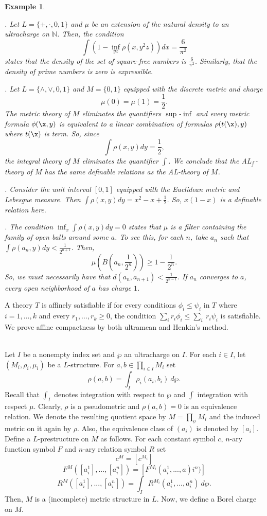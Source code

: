 \documentclass[12pt]{article}
\newtheorem{example}[theorem]{Example}
\def\Nn{\mathbb N}
\begin{document}
\begin{example}
\em{. Let $L=\{+,\cdot,0,1\}$ and $\mu$ be an extension of the natural density to an ultracharge on $\Nn$.
Then, the condition $$\int(1-\inf_{yz}\rho(x,y^2z))dx=\frac{6}{\pi^2}$$
states that the density of the set of square-free numbers is $\frac{6}{\pi^2}$.
Similarly, that the density of prime numbers is zero is expressible.

. Let $L=\{\wedge,\vee,0,1\}$ and $M=\{0,1\}$ equipped with the discrete metric and charge
$$\mu(0)=\mu(1)=\frac{1}{2}.$$
The metric theory of $M$ eliminates the quantifiers $\sup$-$\inf$ and every metric formula $\phi(\x,y)$
is equivalent to a linear combination of formulas $\rho(t(\x),y)$ where $t(\x)$ is term.
So, since $$\int\rho(x,y)dy=\frac{1}{2},$$ the integral theory of $M$ eliminates the quantifier $\int$.
We conclude that the AL$_{\int}$-theory of $M$ has the same definable relations as the AL-theory of $M$.
\bigskip

. Consider the unit interval $[0,1]$ equipped with the Euclidean metric and Lebesgue
measure. Then $\int \rho(x,y)dy=x^2-x+\frac{1}{2}$. So, $x(1-x)$ is a definable relation here.
\bigskip

. The condition $\inf_x\int\rho(x,y)dy=0$ states that $\mu$ is a filter containing
the family of open balls around some $a$.
To see this, for each $n$, take $a_n$ such that $\int\rho(a_n,y)dy<\frac{1}{2^{n+1}}$. Then,
$$\mu(B(a_n,\frac{1}{2^n}))\geqslant1-\frac{1}{2^n}.$$
So, we must necessarily have that $d(a_n,a_{n+1})<\frac{1}{2^{n-1}}$. If $a_n$ converges to $a$,
every open neighborhood of $a$ has charge $1$.}
\end{example}
\bigskip

A theory $T$ is affinely satisfiable if for every conditions $\phi_i\leqslant\psi_i$ in $T$ where $i=1,...,k$
and every $r_1,...,r_k\geqslant0$, the condition $\sum_ir_i\phi_i\leqslant\sum_i\ r_i\psi_i$ is satisfiable.
We prove affine compactness by both ultramean and Henkin's method.
\bigskip

\\
Let $I$ be a nonempty index set and $\wp$ an ultracharge on $I$.
For each $i\in I$, let $(M_i,\rho_i,\mu_i)$ be a $L$-structure.
For $a,b\in \prod_{i\in I} M_i$ set $$\rho(a,b)=\int_I \rho_i(a_i,b_i)\ d\wp.$$
Recall that $\int_I$ denotes integration with respect to $\wp$ and $\int$ integration with respect $\mu$.
Clearly, $\rho$ is a pseudometric and $\rho(a,b)=0$ is an equivalence relation.
We denote the resulting quotient space by $M=\prod_{\wp} M_i$ and
the induced metric on it again by $\rho$.
Also, the equivalence class of $(a_i)$ is denoted by $[a_i]$.
Define a $L$-prestructure on $M$ as follows.
For each constant symbol $c$, $n$-ary function symbol $F$ and $n$-ary relation symbol $R$ set
$$c^M=[c^{M_i}]$$
$$F^M([a_i^1],...,[a_i^n])=[F^{M_i}(a_i^1,...,a)i^n)]$$
$$R^M([a_i^1],...,[a_i^n])=\int_I R^{M_i}(a_i^1,...,a_i^n)\ d\wp.$$
Then, $M$ is a (incomplete) metric structure in $L$. Now, we define a Borel charge on $M$.
\end{document}
